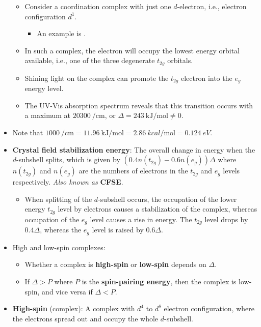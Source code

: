 \documentclass[../notes.tex]{subfiles}
\begin{document}
\begin{itemize}
\begin{itemize}
        \item Consider a coordination complex with just one $d$-electron, i.e., electron configuration $d^1$.
        \begin{itemize}
            \item An example is .
        \end{itemize}
        \item In such a complex, the electron will occupy the lowest energy orbital available, i.e., one of the three degenerate $t_{2g}$ orbitals.
        \item Shining light on the complex can promote the $t_{2g}$ electron into the $e_g$ energy level.
        \item The UV-Vis absorption spectrum reveals that this transition occurs with a maximum at $\SI{20300}{\per\centi\meter}$, or $\Delta=\SI[per-mode=symbol]{243}{\kilo\joule\per\mole}\neq 0$.
    \end{itemize}
    \item Note that $\SI{1000}{\per\centi\metre}=\SI[per-mode=symbol]{11.96}{\kilo\joule\per\mole}=\SI[per-mode=symbol]{2.86}{kcal\per\mole}=\SI{0.124}{eV}$.
    \item \textbf{Crystal field stabilization energy}: The overall change in energy when the $d$-subshell splits, which is given by $(0.4n(t_{2g})-0.6n(e_g))\Delta$ where $n(t_{2g})$ and $n(e_g)$ are the numbers of electrons in the $t_{2g}$ and $e_g$ levels respectively. \emph{Also known as} \textbf{CFSE}.
    \begin{itemize}
        \item When splitting of the $d$-subshell occurs, the occupation of the lower energy $t_{2g}$ level by electrons causes a stabilization of the complex, whereas occupation of the $e_g$ level causes a rise in energy. The $t_{2g}$ level drops by $0.4\Delta$, whereas the $e_g$ level is raised by $0.6\Delta$.
    \end{itemize}
    \item High and low-spin complexes:
    \begin{itemize}
        \item Whether a complex is \textbf{high-spin} or \textbf{low-spin} depends on $\Delta$.
        \item If $\Delta>P$ where $P$ is the \textbf{spin-pairing energy}, then the complex is low-spin, and vice versa if $\Delta<P$.
    \end{itemize}
    \item \textbf{High-spin} (complex): A complex with $d^4$ to $d^8$ electron configuration, where the electrons spread out and occupy the whole $d$-subshell.

\end{itemize}
\end{document}
